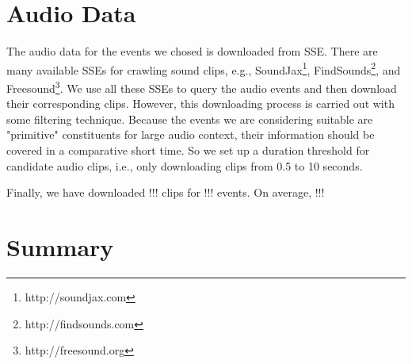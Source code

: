 \section{Audio Data}
The audio data for the events we chosed is downloaded from SSE. 
There are many available SSEs for crawling sound clips, e.g., SoundJax\footnote{http://soundjax.com}, FindSounds\footnote{http://findsounds.com}, and Freesound\footnote{http://freesound.org}. 
We use all these SSEs to query the audio events and then download their corresponding clips. 
However, this downloading process is carried out with some filtering technique. 
Because the events we are considering suitable are "primitive" constituents for large audio context, their information should be covered in a comparative short time. 
So we set up a duration threshold for candidate audio clips, i.e., only downloading clips from 0.5 to 10 seconds.  

Finally, we have downloaded !!! clips for !!! events. On average, !!! 

\section{Summary}

